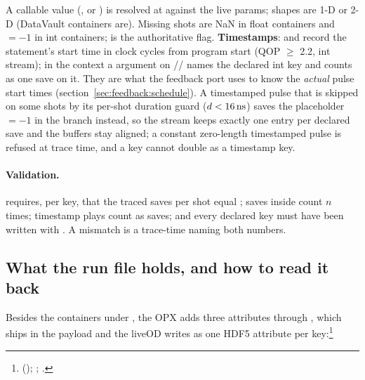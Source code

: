 A callable value (, or ) is resolved at  against the live
params; shapes are 1-D or 2-D (DataVault containers are). Missing shots are
NaN in float containers and  $= -1$ in int containers;
 is the authoritative flag. \textbf{Timestamps}:  and  record the
statement's start time in clock cycles from program start (QOP $\ge$ 2.2, int
stream); in the context a  argument on
// names the
declared int key and counts as one save on it. They are what the feedback
port uses to know the \emph{actual} pulse start times
(section~\ref{sec:feedback:schedule}). A timestamped pulse that is skipped
on some shots by its per-shot duration guard ($d < 16\,\mathrm{ns}$) saves the
placeholder  $= -1$ in the  branch
instead, so the stream keeps exactly one entry per declared save and the
buffers stay aligned; a constant zero-length timestamped pulse is refused
at trace time, and a  key cannot double as a timestamp key.

\paragraph{Validation.}  requires, per key, that the traced
saves per shot equal ; saves inside 
count $n$ times; timestamp plays count as saves; and every declared
 key must have been written with . A
mismatch is a trace-time  naming both numbers.

\subsection{What the run file holds, and how to read it back}
\label{sec:data:file}

Besides the containers under , the OPX adds three attributes
through , which  ships in the
 payload and the liveOD  writes as one HDF5
attribute per key:\footnote{ ();
 ;
 .}

